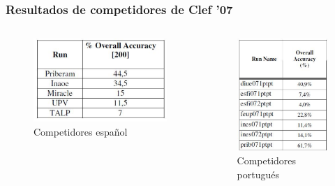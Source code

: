 \begin{frame}
\frametitle{Resultados de competidores de Clef '07}

\begin{columns}[T] %
\begin{column}{.48\textwidth}
  \begin{figure}
      \includegraphics[scale=0.4]{graficos/resultados-espaniol-resumen}
    \caption{Competidores español}
  \end{figure}
\end{column}%
\hfill%
\begin{column}{.48\textwidth}

  \begin{figure}
      \includegraphics[scale=0.4]{graficos/resultados-portugues}
    \caption{Competidores portugués}
  \end{figure}
\end{column}%
\end{columns}

\end{frame}

